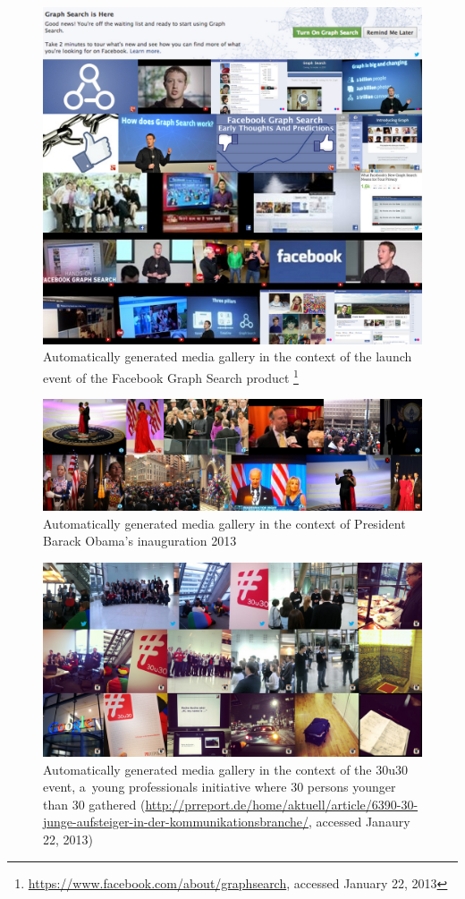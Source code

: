 \begin{figure}[htb]
  \centering
  \includegraphics[width=0.75\linewidth]{facebookgraphsearch}
  \caption[Automatically generated media gallery for Facebook's Graph Search launch]{Automatically generated media gallery in the context of the launch event of the Facebook Graph Search product \footnote{\url{https://www.facebook.com/about/graphsearch},
accessed January 22, 2013}}
  \label{fig:graphsearch}
\end{figure}

\begin{figure}[htb]
  \centering
  \includegraphics[width=0.75\linewidth]{inaug2013}
  \caption[Automatically generated media gallery for Obama's inauguration 2013]{Automatically generated media gallery in the context of President Barack Obama's inauguration 2013}
  \label{fig:inaug2013}
\end{figure}

\begin{figure}[htb]
  \centering
  \includegraphics[width=0.75\linewidth]{30u30}
  \caption[Automatically generated media gallery in the context of the 30u30 event]{Automatically generated media gallery in the context of the 30u30 event, a~young professionals initiative where 30 persons younger than 30 gathered (\url{http://prreport.de/home/aktuell/article/6390-30-junge-aufsteiger-in-der-kommunikationsbranche/},
  accessed Janaury 22, 2013)}
  \label{fig:30u30}
\end{figure}


